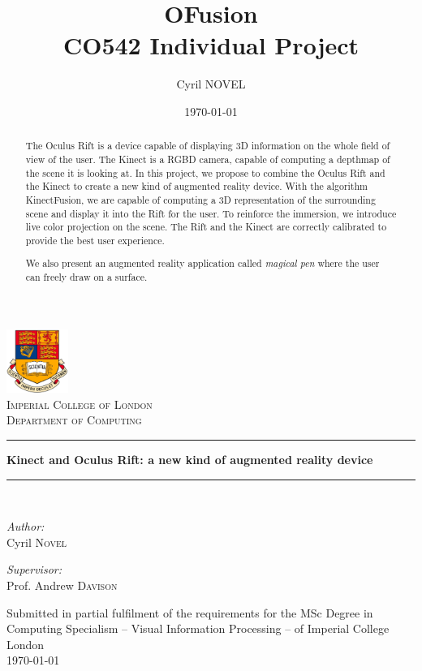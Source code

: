 \documentclass[12pt, twoside]{article}
\title{OFusion\\
\large{CO542 Individual Project}}
\author{Cyril NOVEL}
\date{\today}
\begin{document}
\begin{titlepage}
\begin{center}
\includegraphics[width=0.15\textwidth]{logo.jpeg}~\\[1cm]

\textsc{\LARGE Imperial College of London}\\[0.5cm]

\textsc{\Large Department of Computing}\\[1.5cm]

\rule{\textwidth}{.4pt}
{ \huge \bfseries Kinect and Oculus Rift: a new kind of augmented reality device \\[0.4cm] }

\rule{\textwidth}{.4pt}\\[1.5cm]

\begin{minipage}{0.4\textwidth}
\begin{flushleft} \large
\emph{Author:}\\
Cyril \textsc{Novel}
\end{flushleft}
\end{minipage}
\begin{minipage}{0.4\textwidth}
\begin{flushright} \large
\emph{Supervisor:} \\
Prof. Andrew \textsc{Davison}
\end{flushright}
\end{minipage}

\vfill
{Submitted in partial fulfilment of the requirements for the MSc Degree in Computing Specialism -- Visual Information Processing -- of Imperial College London}\\[0.4cm]
{\large \today}
\end{center}
\end{titlepage}

\newpage
\begin{abstract}
The Oculus Rift is a device capable of displaying 3D information on the whole field of view of the user. The Kinect is a RGBD camera, capable of computing a depthmap of the scene it is looking at. In this project, we propose to combine the Oculus Rift and the Kinect to create a new kind of augmented reality device. With the algorithm KinectFusion, we are capable of computing a 3D representation of the surrounding scene and display it into the Rift for the user. To reinforce the immersion, we introduce live color projection on the scene. The Rift and the Kinect are correctly calibrated to provide the best user experience.

We also present an augmented reality application called \textit{magical pen} where the user can freely draw on a surface.
\end{abstract}~\\[5cm]
\end{document}
